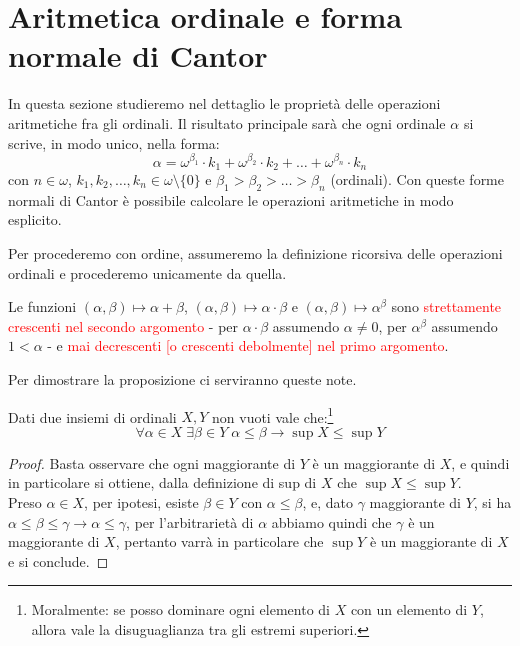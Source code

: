 \section{Aritmetica ordinale e forma normale di Cantor}
In questa sezione studieremo nel dettaglio le propriet\`a delle operazioni aritmetiche fra gli ordinali. Il risultato principale sar\`a che ogni ordinale $\alpha$ si scrive, in modo unico, nella forma:
\[ \alpha = \omega^{\beta_1}\cdot k_1 + \omega^{\beta_2}\cdot k_2 + \ldots + \omega^{\beta_n}\cdot k_n
	\]
con $n \in \omega$, $k_1,k_2,\ldots,k_n \in \omega\setminus\{0\}$ e $\beta_1 > \beta_2 > \ldots > \beta_n$ (ordinali). Con queste forme normali di Cantor \`e possibile calcolare le operazioni aritmetiche in modo esplicito.

\begin{note}
	Per procederemo con ordine, assumeremo la definizione ricorsiva delle operazioni ordinali e procederemo unicamente da quella.
\end{note}

\begin{proposition}
	Le funzioni $(\alpha,\beta)\mapsto \alpha + \beta$, $(\alpha,\beta) \mapsto \alpha \cdot \beta$ e $(\alpha,\beta) \mapsto \alpha^\beta$ sono \textcolor{red}{strettamente crescenti nel secondo argomento} - per $\alpha \cdot \beta$ assumendo $\alpha \ne 0$,
	per $\alpha^\beta$ assumendo $1<\alpha$ - e \textcolor{red}{mai decrescenti [o crescenti debolmente] nel primo argomento}.
\end{proposition}

Per dimostrare la proposizione ci serviranno queste note.

\begin{note}
	Dati due insiemi di ordinali $X,Y$ non vuoti vale che:\footnote{Moralmente: se posso dominare ogni elemento di $X$ con un elemento di $Y$, allora vale la disuguaglianza tra gli estremi superiori.}
	\[ \forall \alpha \in X \; \exists \beta \in Y \; \alpha \leq \beta \rightarrow \sup X \leq \sup Y
		\]
\end{note}

\begin{proof}
	Basta osservare che ogni maggiorante di $Y$ \`e un maggiorante di $X$, e quindi in particolare si ottiene, dalla definizione di sup di $X$ che $\sup X \leq \sup Y$.\\
	Preso $\alpha \in X$, per ipotesi, esiste $\beta \in Y$ con $\alpha \leq \beta$, e, dato $\gamma$ maggiorante di $Y$, si ha $\alpha \leq \beta \leq \gamma \to \alpha \leq \gamma$,
	per l'arbitrariet\`a di $\alpha$ abbiamo quindi che $\gamma$ \`e un maggiorante di $X$, pertanto varr\`a in particolare che $\sup Y$ \`e un maggiorante di $X$ e si conclude.
\end{proof}

